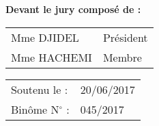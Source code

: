 \begin{titlepage}
\begin{center}
\vspace{\fill}

\textbf{Devant le jury composé de :}

\vspace{0.5em}

\begin{minipage}[c]{0.5\textwidth}
\begin{tabular}{p{} l}
Mme DJIDEL & Président \\
Mme HACHEMI & Membre
\end{tabular}
\end{minipage}

\vfill

\begin{tabular}{l l}
  Soutenu le : & 20/06/2017 \\[0.3em]
  Binôme N$^\circ$ : & 045/2017
\end{tabular}
\end{center}
\end{titlepage}
